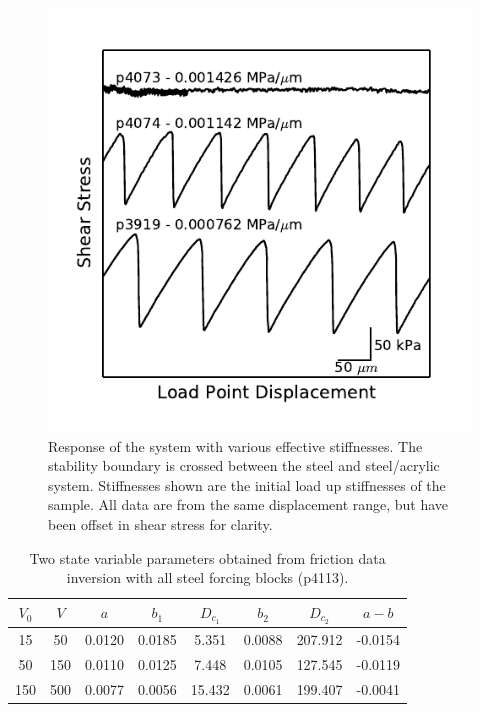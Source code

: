 \begin{figure}
\begin{center}
\includegraphics{chap_granular_stiffness/Fig12.pdf}
\caption{\label{fig:transition}
Response of the system with various effective stiffnesses.  The stability
boundary is crossed between the steel and steel/acrylic system.  Stiffnesses
shown are the initial load up stiffnesses of the sample.  All data are from the
same displacement range, but have been offset in shear stress for clarity. }
\end{center}
\end{figure}

\begin{table}
\begin{center}
\begin{tabular}{cccccccc}
$V_0$ & $V$ & $a$ & $b_1$ & $D_{c_1}$ & $b_2$ & $D_{c_2}$ & $a-b$ \\
\hline
\hline
15&50&0.0120&0.0185&5.351&0.0088&207.912&-0.0154\\
50&150&0.0110&0.0125&7.448&0.0105&127.545&-0.0119\\
150&500&0.0077&0.0056&15.432&0.0061&199.407&-0.0041\\
\hline
\end{tabular}
\end{center}
\caption{Two state variable parameters obtained from friction data inversion with all steel forcing blocks (p4113).}
\label{rsf_params}
\end{table}

